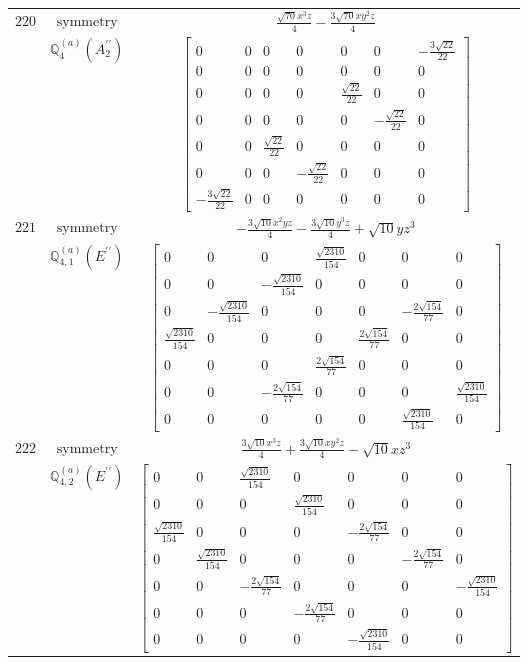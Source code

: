 \documentclass[fleqn,8pt,landscape]{jsarticle}
\begin{document}
\begin{longtable}{ccc}
$ 220 $ & $ \text{symmetry} $ & $ \frac{\sqrt{70} x^{3} z}{4} - \frac{3 \sqrt{70} x y^{2} z}{4} $ \\
$  $ & $ \mathbb{Q}_{4}^{(a)}(A_{2}^{\prime\prime}) $ & $ \begin{bmatrix} 0 & 0 & 0 & 0 & 0 & 0 & - \frac{3 \sqrt{22}}{22} \\ 0 & 0 & 0 & 0 & 0 & 0 & 0 \\ 0 & 0 & 0 & 0 & \frac{\sqrt{22}}{22} & 0 & 0 \\ 0 & 0 & 0 & 0 & 0 & - \frac{\sqrt{22}}{22} & 0 \\ 0 & 0 & \frac{\sqrt{22}}{22} & 0 & 0 & 0 & 0 \\ 0 & 0 & 0 & - \frac{\sqrt{22}}{22} & 0 & 0 & 0 \\ - \frac{3 \sqrt{22}}{22} & 0 & 0 & 0 & 0 & 0 & 0 \end{bmatrix} $ \\ \hline
$ 221 $ & $ \text{symmetry} $ & $ - \frac{3 \sqrt{10} x^{2} y z}{4} - \frac{3 \sqrt{10} y^{3} z}{4} + \sqrt{10} y z^{3} $ \\
$  $ & $ \mathbb{Q}_{4,1}^{(a)}(E^{\prime\prime}) $ & $ \begin{bmatrix} 0 & 0 & 0 & \frac{\sqrt{2310}}{154} & 0 & 0 & 0 \\ 0 & 0 & - \frac{\sqrt{2310}}{154} & 0 & 0 & 0 & 0 \\ 0 & - \frac{\sqrt{2310}}{154} & 0 & 0 & 0 & - \frac{2 \sqrt{154}}{77} & 0 \\ \frac{\sqrt{2310}}{154} & 0 & 0 & 0 & \frac{2 \sqrt{154}}{77} & 0 & 0 \\ 0 & 0 & 0 & \frac{2 \sqrt{154}}{77} & 0 & 0 & 0 \\ 0 & 0 & - \frac{2 \sqrt{154}}{77} & 0 & 0 & 0 & \frac{\sqrt{2310}}{154} \\ 0 & 0 & 0 & 0 & 0 & \frac{\sqrt{2310}}{154} & 0 \end{bmatrix} $ \\ \hline
$ 222 $ & $ \text{symmetry} $ & $ \frac{3 \sqrt{10} x^{3} z}{4} + \frac{3 \sqrt{10} x y^{2} z}{4} - \sqrt{10} x z^{3} $ \\
$  $ & $ \mathbb{Q}_{4,2}^{(a)}(E^{\prime\prime}) $ & $ \begin{bmatrix} 0 & 0 & \frac{\sqrt{2310}}{154} & 0 & 0 & 0 & 0 \\ 0 & 0 & 0 & \frac{\sqrt{2310}}{154} & 0 & 0 & 0 \\ \frac{\sqrt{2310}}{154} & 0 & 0 & 0 & - \frac{2 \sqrt{154}}{77} & 0 & 0 \\ 0 & \frac{\sqrt{2310}}{154} & 0 & 0 & 0 & - \frac{2 \sqrt{154}}{77} & 0 \\ 0 & 0 & - \frac{2 \sqrt{154}}{77} & 0 & 0 & 0 & - \frac{\sqrt{2310}}{154} \\ 0 & 0 & 0 & - \frac{2 \sqrt{154}}{77} & 0 & 0 & 0 \\ 0 & 0 & 0 & 0 & - \frac{\sqrt{2310}}{154} & 0 & 0 \end{bmatrix} $ \\ \hline

\end{longtable}
\end{document}
